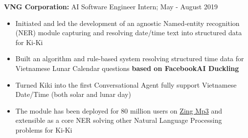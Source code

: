 \documentclass[a4paper,11pt]{article}
\begin{document}
\begin{flushleft}

	\textbf{VNG Corporation: } AI Software Engineer Intern; May - August 2019 \\
	\vspace{-\topsep}
	\begin{itemize}
		\setlength{\parskip}{2pt}
		\setlength{\itemsep}{0pt plus 1pt}
		\item Initiated and led the development of an agnostic Named-entity recognition (NER) module capturing and resolving date/time text into structured data for Ki-Ki
		\item Built an algorithm and rule-based system resolving structured time data for Vietnamese Lunar Calendar questions \textbf{based on FacebookAI Duckling}  
		\item Turned Kiki into the first Conversational Agent fully support Vietnamese Date/Time (both solar and lunar day) 
		\item  The module has been deployed for 80 million users on \href{https://mp3.zing.vn/}{Zing Mp3} and extensible as a core NER solving other Natural Language Processing problems for Ki-Ki
	\end{itemize}
\vspace{-\topsep}
\centering{\noindent\makebox{\rule{8cm}{1.5pt}}}
\end{flushleft} 
\end{document}
